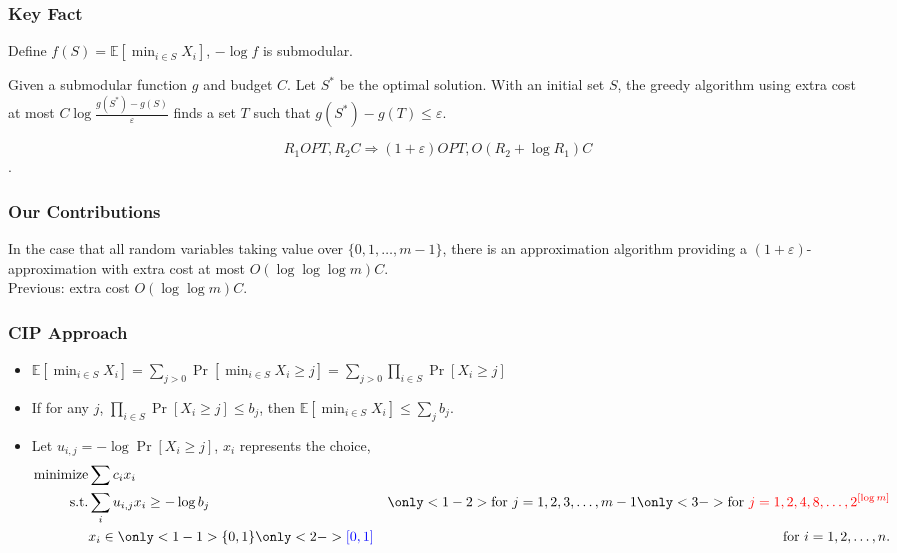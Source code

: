 \documentclass{beamer}
\newcommand{\Exp}{{\mathbb{E}}}
\begin{document}
\begin{frame}
    \frametitle{Key Fact}
    \begin{theorem}
        Define $f(S) =\Exp[ \min_{i\in S} X_i]$, $-\log f$ is submodular.
    \end{theorem}
    \begin{theorem}
        \label{thm:add-submod}
Given a submodular function $g$ and budget $C$. Let $S^*$ be the optimal solution. With an initial set $S$, the greedy algorithm using extra cost at most $C\log\frac{g(S^*) - g(S)}{\varepsilon}$ finds a set $T$ such that $g(S^*) - g(T) \leq \varepsilon$.
    \end{theorem}
    \begin{spacing}{2.0}

    \end{spacing}
    $$R_1 OPT, R_2 C \Longrightarrow (1+\varepsilon)OPT, O(R_2 + \log R_1) C$$.
\end{frame}

\begin{frame}
\frametitle{Our Contributions}
\begin{theorem}
    In the case that all random variables taking value over $\{0, 1, \ldots, m - 1\}$, there is an approximation algorithm providing a $(1+\varepsilon)$-approximation with extra cost at most $O(\log\log\log m)C$.\\
    {\color{blue} Previous: extra cost $O(\log\log m)C$.}
\end{theorem}
\end{frame}

\begin{frame}
    \frametitle{CIP Approach}
    \begin{itemize}
        \item $\Exp[\min_{i\in S} X_i]
            = \sum_{j > 0} \Pr[\min_{i\in S} X_i \geq j] 
            = \sum_{j > 0} \prod_{i\in S}\Pr[X_i \geq j]$
        \item If for any $j$, $\prod_{i\in S}\Pr[X_i \geq j] \leq b_j$, then $\Exp[\min_{i\in S} X_i] \leq \sum_j b_j$.
        \item Let $u_{i,j} = -\log \Pr[X_i \geq j]$, $x_i$ represents the choice,
            \begin{align*}
                \text{minimize} & \sum c_i x_i & \\
                \text{s.t.}
                & \sum_i u_{i,j} x_i \geq -\log b_j
                & \only<1-2>{ \text{for } j = 1, 2, 3, \ldots, m - 1} 
                \only<3->{\text{for } {\color{red} j = 1, 2, 4, 8, \ldots, 2^{[\log m]}}}\\
            & x_i \in 
                \only<1-1>{\{0, 1\}} 
                \only<2->{{\color{blue} [0,1]}} 
                & \text{for } i = 1, 2, \ldots, n.
            \end{align*}
    \end{itemize}
\end{frame}
\end{document}
